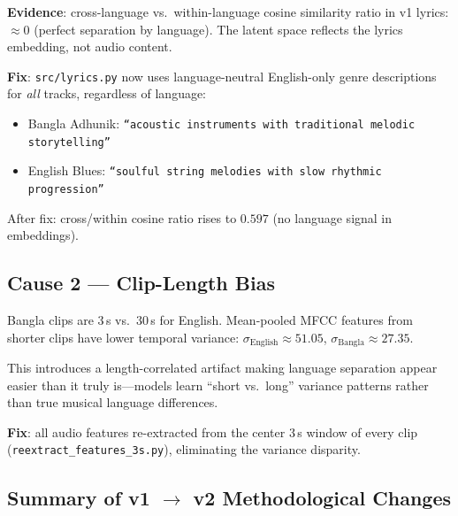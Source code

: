 \documentclass{article}
\begin{document}
\textbf{Evidence}: cross-language vs.\ within-language cosine similarity ratio in v1
lyrics: $\approx\!0$ (perfect separation by language). The latent space reflects the
lyrics embedding, not audio content.

\textbf{Fix}: \texttt{src/lyrics.py} now uses language-neutral English-only genre
descriptions for \emph{all} tracks, regardless of language:
\begin{itemize}
    \item Bangla Adhunik: \texttt{``acoustic instruments with traditional melodic storytelling''}
    \item English Blues: \texttt{``soulful string melodies with slow rhythmic progression''}
\end{itemize}
After fix: cross/within cosine ratio rises to $0.597$ (no language signal in embeddings).

\subsection{Cause 2 --- Clip-Length Bias}

Bangla clips are 3\,s vs.\ 30\,s for English. Mean-pooled MFCC features from shorter
clips have lower temporal variance:
$\sigma_\text{English} \approx 51.05$, $\sigma_\text{Bangla} \approx 27.35$.

This introduces a length-correlated artifact making language separation appear easier
than it truly is---models learn ``short vs.\ long'' variance patterns rather than true
musical language differences.

\textbf{Fix}: all audio features re-extracted from the center 3\,s window of every
clip (\texttt{reextract\_features\_3s.py}), eliminating the variance disparity.

\subsection{Summary of v1 $\to$ v2 Methodological Changes}
\end{document}
